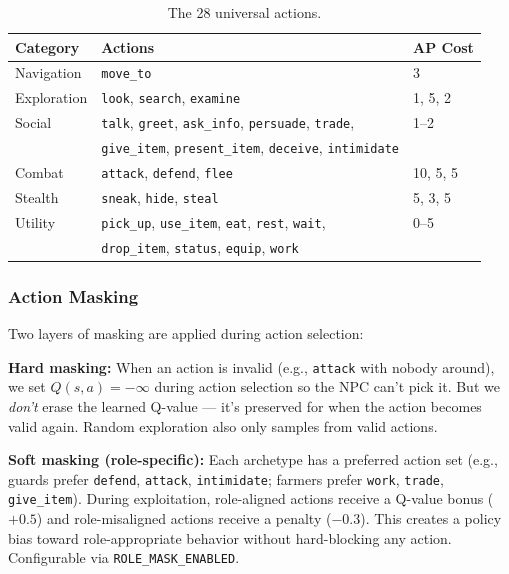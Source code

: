 \begin{table}[ht]
\centering
\caption{The 28 universal actions.}
\label{tab:actions}
\begin{tabular}{@{}lll@{}}
\toprule
Category & Actions & AP Cost \\
\midrule
Navigation & \texttt{move\_to} & 3 \\
Exploration & \texttt{look}, \texttt{search}, \texttt{examine} & 1, 5, 2 \\
Social & \texttt{talk}, \texttt{greet}, \texttt{ask\_info}, \texttt{persuade}, \texttt{trade}, & 1--2 \\
 & \texttt{give\_item}, \texttt{present\_item}, \texttt{deceive}, \texttt{intimidate} & \\
Combat & \texttt{attack}, \texttt{defend}, \texttt{flee} & 10, 5, 5 \\
Stealth & \texttt{sneak}, \texttt{hide}, \texttt{steal} & 5, 3, 5 \\
Utility & \texttt{pick\_up}, \texttt{use\_item}, \texttt{eat}, \texttt{rest}, \texttt{wait}, & 0--5 \\
 & \texttt{drop\_item}, \texttt{status}, \texttt{equip}, \texttt{work} & \\
\bottomrule
\end{tabular}
\end{table}

\subsubsection{Action Masking}

Two layers of masking are applied during action selection:

\textbf{Hard masking:} When an action is invalid (e.g., \texttt{attack} with nobody around), we set $Q(s,a) = -\infty$ during action selection so the NPC can't pick it. But we \emph{don't} erase the learned Q-value --- it's preserved for when the action becomes valid again. Random exploration also only samples from valid actions.

\textbf{Soft masking (role-specific):} Each archetype has a preferred action set (e.g., guards prefer \texttt{defend}, \texttt{attack}, \texttt{intimidate}; farmers prefer \texttt{work}, \texttt{trade}, \texttt{give\_item}). During exploitation, role-aligned actions receive a Q-value bonus ($+0.5$) and role-misaligned actions receive a penalty ($-0.3$). This creates a policy bias toward role-appropriate behavior without hard-blocking any action. Configurable via \texttt{ROLE\_MASK\_ENABLED}.


